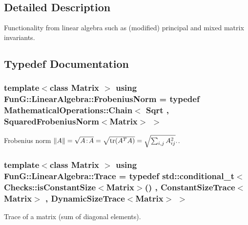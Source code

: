 \subsection{Detailed Description}
Functionality from linear algebra such as (modified) principal and mixed matrix invariants. 

\subsection{Typedef Documentation}
\hypertarget{group__LinearAlgebraGroup_gad209833e37a25e863fe72868d37795b8}{
\subsubsection[{Frobenius\-Norm}]{\setlength{\rightskip}{0pt plus 5cm}template$<$class Matrix $>$ using {\bf Fun\-G\-::\-Linear\-Algebra\-::\-Frobenius\-Norm} = typedef Mathematical\-Operations\-::\-Chain$<$ Sqrt , Squared\-Frobenius\-Norm$<$Matrix$>$ $>$}}\label{group__LinearAlgebraGroup_gad209833e37a25e863fe72868d37795b8}


Frobenius norm $ \|A\| = \sqrt{A\negthinspace : \negthinspace A }= \sqrt{\mathrm{tr}(A^TA)} = \sqrt{\sum_{i,j} A_{ij}^2}. $. 

\hypertarget{group__LinearAlgebraGroup_ga43e327309edc349c75ceecd29b7abde2}{
\subsubsection[{Trace}]{\setlength{\rightskip}{0pt plus 5cm}template$<$class Matrix $>$ using {\bf Fun\-G\-::\-Linear\-Algebra\-::\-Trace} = typedef std\-::conditional\-\_\-t$<$ Checks\-::is\-Constant\-Size$<$Matrix$>$() , Constant\-Size\-Trace$<$Matrix$>$ , Dynamic\-Size\-Trace$<$Matrix$>$ $>$}}\label{group__LinearAlgebraGroup_ga43e327309edc349c75ceecd29b7abde2}


Trace of a matrix (sum of diagonal elements). 



